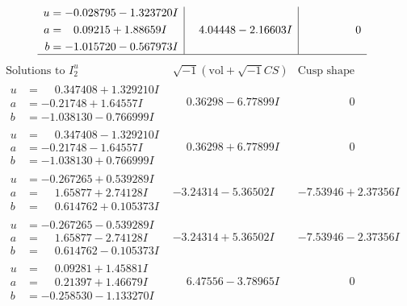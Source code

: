 \documentclass[1p]{elsarticle_modified}
\theoremstyle{definition}
\newcommand{\I}{\sqrt{-1}}
\begin{document}
$$\begin{array}{c|c|c}
\begin{aligned}
u &= -0.028795 - 1.323720 I \\
a &= \phantom{-}0.09215 + 1.88659 I \\
b &= -1.015720 - 0.567973 I\end{aligned}
 & \phantom{-}4.04448 - 2.16603 I & \phantom{-0.000000 } 0\\
 \hline 
 \end{array}$$\newpage$$\begin{array}{c|c|c}  
\text{Solutions to }I^u_{2}& \I (\text{vol} + \sqrt{-1}CS) & \text{Cusp shape}\\
 \hline 
\begin{aligned}
u &= \phantom{-}0.347408 + 1.329210 I \\
a &= -0.21748 + 1.64557 I \\
b &= -1.038130 - 0.766999 I\end{aligned}
 & \phantom{-}0.36298 - 6.77899 I & \phantom{-0.000000 } 0 \\ \hline\begin{aligned}
u &= \phantom{-}0.347408 - 1.329210 I \\
a &= -0.21748 - 1.64557 I \\
b &= -1.038130 + 0.766999 I\end{aligned}
 & \phantom{-}0.36298 + 6.77899 I & \phantom{-0.000000 } 0 \\ \hline\begin{aligned}
u &= -0.267265 + 0.539289 I \\
a &= \phantom{-}1.65877 + 2.74128 I \\
b &= \phantom{-}0.614762 + 0.105373 I\end{aligned}
 & -3.24314 - 5.36502 I & -7.53946 + 2.37356 I \\ \hline\begin{aligned}
u &= -0.267265 - 0.539289 I \\
a &= \phantom{-}1.65877 - 2.74128 I \\
b &= \phantom{-}0.614762 - 0.105373 I\end{aligned}
 & -3.24314 + 5.36502 I & -7.53946 - 2.37356 I \\ \hline\begin{aligned}
u &= \phantom{-}0.09281 + 1.45881 I \\
a &= \phantom{-}0.21397 + 1.46679 I \\
b &= -0.258530 - 1.133270 I\end{aligned}
 & \phantom{-}6.47556 - 3.78965 I & \phantom{-0.000000 } 0 \\ \hline\begin{aligned}

\end{aligned}
\end{array}$$
\end{document}
